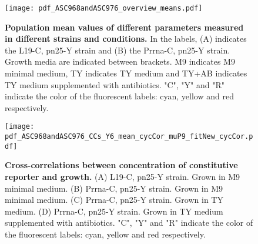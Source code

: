 \begin{figure}
    \centering
    \texttt{[image: pdf\_ASC968andASC976\_overview\_means.pdf]}
    \caption{ 
        \textbf{Population mean values of different parameters measured in different strains and conditions.}
        In the labels, (A) indicates the L19-C, pn25-Y strain and (B) the Prrna-C, pn25-Y strain.
        Growth media are indicated between brackets. 
        M9 indicates M9 minimal medium, TY indicates TY medium and TY+AB indicates TY medium supplemented with antibiotics.
        "C", "Y" and "R" indicate the color of the fluorescent labels: cyan, yellow and red respectively.
    }
    \label{fig:ribo:meansPn25R}
\end{figure}



\begin{figure}
    \centering
    \texttt{[image: pdf\_ASC968andASC976\_CCs\_Y6\_mean\_cycCor\_muP9\_fitNew\_cycCor.pdf]}
    \caption{ 
        \textbf{Cross-correlations between concentration of constitutive reporter and growth.}
        (A) L19-C, pn25-Y strain. Grown in M9 minimal medium.
        (B) Prrna-C, pn25-Y strain. Grown in M9 minimal medium.
        (C) Prrna-C, pn25-Y strain. Grown in TY medium.
        (D) Prrna-C, pn25-Y strain. Grown in TY medium supplemented with antibiotics.
        "C", "Y" and "R" indicate the color of the fluorescent labels: cyan, yellow and red respectively.
    }
    \label{fig:ribo:CCsEmuYpn25}
\end{figure}

